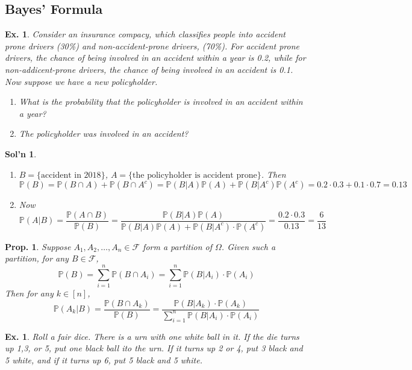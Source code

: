 \documentclass[12pt, a4paper]{book}
\renewcommand{\Pr}{\mathbb{P}}
\newtheorem{proposition}[theorem]{Prop.}
\newtheorem{example}[theorem]{Ex.}
\theoremstyle{nonumberplain}
\newtheorem{solution}{Sol'n}
\begin{document}
\subsection{Bayes' Formula}
\begin{example}
    Consider an insurance compacy, which classifies people into accident prone drivers (30\%) and non-accident-prone drivers, (70\%).
    For accident prone drivers, the chance of being involved in an accident within a year is 0.2, while for non-addicent-prone drivers, the chance of being involved in an accident is 0.1.
    Now suppose we have a new policyholder.
    \begin{enumerate}[nolistsep]
        \item What is the probability that the policyholder is involved in an accident within a year?
        \item The policyholder was involved in an accident?
    \end{enumerate}
\end{example}
\begin{solution}
    \begin{enumerate}
        \item $B=\{\text{accident in 2018}\}$, $A=\{\text{the policyholder is accident prone}\}$.
            Then
            \[\Pr(B)=\Pr(B\cap A)+\Pr(B\cap A^c)=\Pr(B|A)\Pr(A)+\Pr(B|A^c)\Pr(A^c)=0.2\cdot 0.3+0.1\cdot 0.7=0.13\]
        \item Now
            \[\Pr(A|B)=\frac{\Pr(A\cap B)}{\Pr(B)}=\frac{\Pr(B|A)\Pr(A)}{\Pr(B|A)\Pr(A)+\Pr(B|A^c)\cdot\Pr(A^c)}=\frac{0.2\cdot 0.3}{0.13}=\frac{6}{13}\]
    \end{enumerate}
\end{solution}
\begin{proposition}
    Suppose $A_1,A_2,\ldots,A_n\in\mathcal{F}$ form a partition of $\Omega$.
    Given such a partition, for any $B\in\mathcal{F}$,
    \[\Pr(B)=\sum\limits_{i=1}^n\Pr(B\cap A_i)=\sum\limits_{i=1}^n\Pr(B|A_i)\cdot\Pr(A_i)\]
    Then for any $k\in[n]$,
    \[\Pr(A_k|B)=\frac{\Pr(B\cap A_k)}{\Pr(B)}=\frac{\Pr(B|A_k)\cdot\Pr(A_k)}{\sum\limits_{i=1}^n\Pr(B|A_i)\cdot\Pr(A_i)}\]
\end{proposition}
\begin{example}
    Roll a fair dice.
    There is a urn with one white ball in it.
    If the die turns up 1,3, or 5, put one black ball ito the urn.
    If it turns up 2 or 4, put 3 black and 5 white, and if it turns up 6, put 5 black and 5 white.
\end{example}
\end{document}
